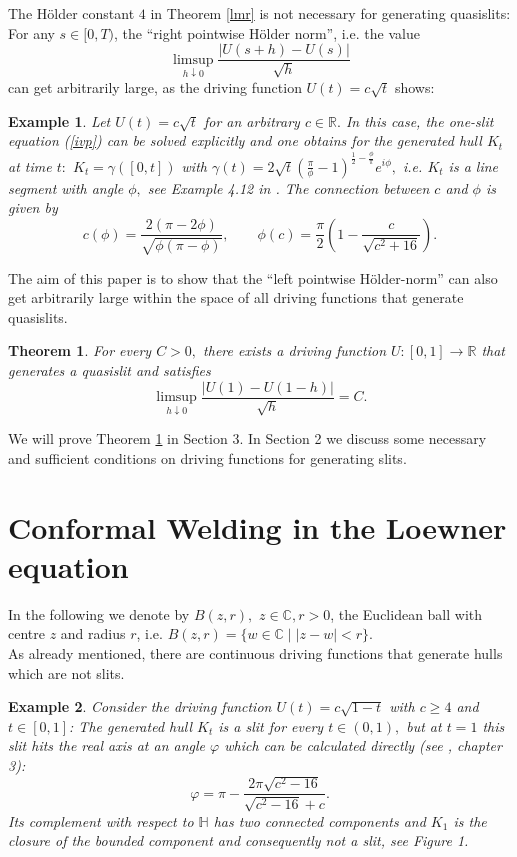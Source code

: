 \documentclass[11pt]{amsart}
\numberwithin{equation}{section}
\theoremstyle{plain}
\newtheorem{theorem}{Theorem}
\newtheorem{example}{Example}
\theoremstyle{definition}
\begin{document}
The H\"older constant $4$ in Theorem \ref{lmr} is not necessary for generating quasislits: For any $s\in[0,T)$, the ``right pointwise H\"older norm'', i.e. the value $$\limsup_{h\downarrow0}\frac{|U(s+h)-U(s)|}{\sqrt{h}}$$ can get arbitrarily large, as the driving function $U(t)=c\sqrt{t}$ shows:

\begin{example}\label{Maxime}
Let $U(t)=c\sqrt{t}$ for an arbitrary $c\in{\mathbb R}.$ In this case, the one-slit equation (\ref{ivp}) can be solved explicitly and one obtains for the generated hull $K_t$ at time $t:$ $K_t=\gamma([0,t])$ with $\gamma(t)=2\sqrt{t}\left(\frac{\pi}{\phi}-1\right)^{\frac1{2}-\frac{\phi}{\pi}}e^{i\phi},$ i.e. $K_t$ is a line segment with angle $\phi,$ see Example 4.12 in \cite{Lawler:2005}. The connection between $c$ and $\phi$ is given by
$$c(\phi)=\frac{2(\pi-2\phi)}{\sqrt{\phi(\pi-\phi)}},\qquad \phi(c)=\frac{\pi}{2}\left(1-\frac{c}{\sqrt{c^2+16}}\right).$$
\end{example}

The aim of this paper is to show that the ``left pointwise H\"older-norm'' can also get arbitrarily large within the space of all driving functions that generate quasislits.

\begin{theorem}\label{proop}
 For every $C>0,$ there exists a driving function $U:[0,1]\to{\mathbb R}$ that generates a quasislit and satisfies
$$ \limsup_{h\downarrow0}\frac{|U(1)-U(1-h)|}{\sqrt{h}}=C. $$
\end{theorem}

We will prove Theorem \ref{proop} in Section 3. In Section 2 we discuss
some necessary and sufficient conditions on driving functions for generating  slits.

\section{Conformal Welding in the Loewner equation}

In the following we denote by $B(z,r),$ $z\in{\mathbb C}, r>0$, the Euclidean ball with centre $z$ and radius $r$, i.e. $B(z,r)=\{w\in{\mathbb C}\;|\; |z-w|<r\}.$\\

As already mentioned, there are continuous driving functions that generate hulls which are not slits.

\begin{example}\label{Felix}
 Consider the driving function $U(t) = c\sqrt{1-t}$ with $c\geq 4$ and $t\in [0,1]$: The generated hull $K_t$ is a slit for every $t\in(0,1),$ but at $t=1$ this slit hits the real axis at an angle $\varphi$ which can be calculated directly (see \cite{LindMR:2010}, chapter 3): $$ \varphi = \pi-\frac{2\pi\sqrt{c^2-16}}{\sqrt{c^2-16}+c}. $$ Its complement with respect to ${\mathbb H}$ has two connected components and $K_1$ is the closure of the bounded component  and consequently not a slit, see Figure 1.
\end{example}
\end{document}
